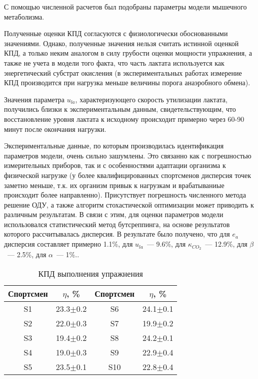 С помощью численной расчетов был подобраны параметры модели мышечного метаболизма.

Полученные оценки КПД согласуются с физиологически обоснованными значениями. Однако, полученные значения нельзя считать истинной оценкой КПД, а только неким аналогом в силу грубости оценки мощности упражнения, а также не учета в модели того факта, что часть лактата используется как энергетический субстрат окисления (в экспериментальных работах измерение КПД производится при нагрузка меньше величины порога анаэробного обмена).

Значения параметра \(u_{la}\), характеризующего скорость утилизации лактата, получились близки к экспериментальным данным, свидетельствующим, что восстановление уровня лактата к исходному происходит примерно через 60-90 минут после окончания нагрузки. 

Экспериментальные данные, по которым производилась идентификация параметров модели, очень сильно зашумлены. Это связанно как с погрешностью измерительных приборов, так и с особенностями адаптации организма к физической нагрузке (у более квалифицированных спортсменов дисперсия точек заметно меньше, т.к. их организм привык к нагрузкам и врабатываниые происходит более направленно). Присутствует погрешность численного метода решение ОДУ, а также алгоритм стохастической оптимизации может приводить к различным результатам. В связи с этим, для оценки параметров модели использовался статистический метод бутсреппинга, на основе результатов которого рассчитывалась дисперсия.     
В результате было получено, что для \(e_{a}\) дисперсия составляет примерно 1.1\%, для \(u_{la}\)~--- 9.6\%, для \(\kappa_{CO_{2}}\)~--- 12.9\%, для \(\beta\)~--- 2.5\%, для \(\alpha\)~--- 1\%..


\begin{table}[!ht]
\centering
\caption{КПД выполнения упражнения}
\medskip
\label{tabular:tab5}
\begin{tabular}{|c|c|c|c|}
\hline
Спортсмен &  \(\eta\), \% & Спортсмен &  \(\eta\), \% \\
\hline
S1 & 23.3$\pm$0.2 & S6 & 24.1$\pm$0.1\\
\hline
S2 & 22.0$\pm$0.3 & S7 & 19.9$\pm$0.2\\
\hline
S3 & 19.4$\pm$0.2 & S8 & 24.2$\pm$0.1\\
\hline
S4 & 19.0$\pm$0.3 & S9 & 22.9$\pm$0.4\\
\hline
S5 & 23.5$\pm$0.1 & S10 & 22.8$\pm$0.4\\
\hline
\end{tabular}
\end{table}

